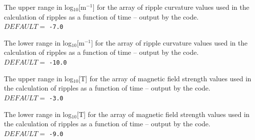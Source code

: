 \documentclass[12pt,a4paper]{article}
\begin{document}
  \vspace{0.5cm}

  \setlength{\temptextwidth}{\textwidth}  
  \addtolength{\temptextwidth}{-1.0\parindent} 
    
    \parbox[t]{\temptextwidth}{The upper range in log$_{10}$[m$^{-1}$] for 
                               the array of ripple curvature values used in 
                               the calculation of ripples as a function of 
                               time -- output by the  code. \\ 
                               $DEFAULT=$ {\tt -7.0}}

  \vspace{0.5cm}

  \setlength{\temptextwidth}{\textwidth}   
  \addtolength{\temptextwidth}{-1.0\parindent} 
    
    \parbox[t]{\temptextwidth}{The lower range in log$_{10}$[m$^{-1}$] for 
                               the array of ripple curvature values used in 
                               the calculation of ripples as a function of 
                               time -- output by the  code. \\ 
                               $DEFAULT=$ {\tt -10.0}}

  \vspace{0.5cm}

  \setlength{\temptextwidth}{\textwidth}  
  \addtolength{\temptextwidth}{-1.0\parindent} 
    
    \parbox[t]{\temptextwidth}{The upper range in log$_{10}$[T] for the 
                               array of magnetic field strength values used in 
                               the calculation of ripples as a function of 
                               time -- output by the  code. \\ 
                               $DEFAULT=$ {\tt -3.0}}

  \vspace{0.5cm}

  \setlength{\temptextwidth}{\textwidth}  
  \addtolength{\temptextwidth}{-1.0\parindent} 
    
    \parbox[t]{\temptextwidth}{The lower range in log$_{10}$[T] for the  
                               array of magnetic field strength values used in 
                               the calculation of ripples as a function of 
                               time -- output by the  code. \\ 
                               $DEFAULT=$ {\tt -9.0}}
\end{document}
